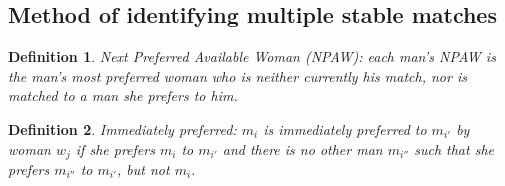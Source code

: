 \documentclass[WP]{AEA}
\newtheorem{deff}{Definition}
\begin{document}
\subsection{Method of identifying multiple stable matches}
\begin{deff}
	Next Preferred Available Woman (NPAW): each man's NPAW is the man's most preferred woman who is neither currently his match, nor is matched to a man she prefers to him. 
\end{deff}

\begin{deff}
	Immediately preferred: $m_i$ is immediately preferred to $m_{i'}$ by woman $w_j$ if she prefers  $m_{i}$ to $m_{i'}$ and there is no other man $m_{i''}$ such that she prefers $m_{i''}$ to $m_{i'}$, but not $m_{i}$.
\end{deff}
\end{document}
